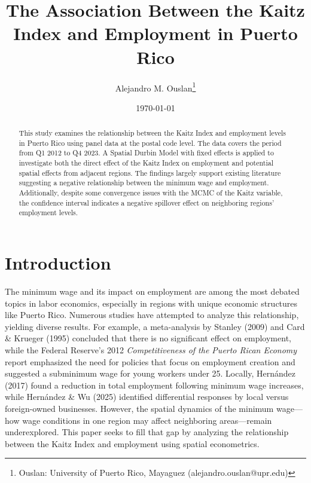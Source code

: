 \documentclass[AEJ]{AEA}
\begin{document}
\title{The Association Between the Kaitz Index and Employment in Puerto Rico}
\author{Alejandro M. Ouslan\thanks{%
		Ouslan: University of Puerto Rico, Mayaguez (alejandro.ouslan@upr.edu)}}
\date{\today}

\begin{abstract}
	This study examines the relationship between the Kaitz Index and employment
	levels in Puerto Rico using panel data at the postal code level.
	The data covers the period from Q1 2012 to Q4 2023. A Spatial Durbin
	Model with fixed effects is applied to investigate both the direct effect
	of the Kaitz Index on employment and potential spatial effects from adjacent
	regions. The findings largely support existing literature suggesting a
	negative relationship between the minimum wage and employment.
	Additionally, despite some convergence issues with the MCMC of the Kaitz
	variable, the confidence interval indicates a negative spillover effect on
	neighboring regions’ employment levels.
\end{abstract}

\maketitle

\section{Introduction}

The minimum wage and its impact on employment are among the most debated topics
in labor economics, especially in regions with unique economic structures like
Puerto Rico. Numerous studies have attempted to analyze this relationship,
yielding diverse results. For example, a meta-analysis by Stanley (2009)
and Card \& Krueger (1995)  concluded that there is no significant effect
on employment, while the Federal Reserve's 2012
\textit{Competitiveness of the Puerto Rican Economy} report emphasized
the need for policies that focus on employment creation and suggested a
subminimum wage for young workers under 25. Locally, Hernández (2017)
found a reduction in total employment following minimum wage increases,
while Hernández \& Wu (2025) identified differential responses by local versus
foreign-owned businesses. However, the spatial dynamics of the minimum
wage—how wage conditions in one region may affect neighboring areas—remain
underexplored. This paper seeks to fill that gap by analyzing the relationship
between the Kaitz Index and employment using spatial econometrics.
\end{document}
